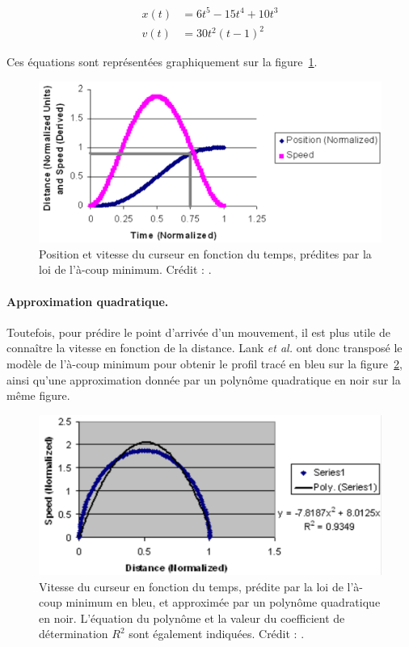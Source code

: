 	\begin{align}
		\label{eq:kepP}
		x(t) &= 6t^{5} - 15t^{4} + 10t^{3} \\
		\label{eq:kepV}
		v(t) &= 30t^{2}(t - 1)^{2}
	\end{align}
	
	Ces équations sont représentées graphiquement sur la figure~\ref{fig:kepPS}.
	
	\begin{figure}[H]
		\centering
		\includegraphics[width=\textwidth]{figures/ch2/kepPS}
		\caption[À-coup minimum -- position et vitesse du curseur vs. temps]{Position et vitesse du curseur en fonction du temps, prédites par la loi de l'à-coup minimum. Crédit : \cite{lank2007endpoint}.}
		\label{fig:kepPS}
	\end{figure}
	
	\paragraph{Approximation quadratique.}
	Toutefois, pour prédire le point d'arrivée d'un mouvement, il est plus utile de connaître la vitesse en fonction de la distance. Lank \emph{et al.} ont donc transposé le modèle de l'à-coup minimum pour obtenir le profil tracé en bleu sur la figure~\ref{fig:kepQuad}, ainsi qu'une approximation donnée par un polynôme quadratique en noir sur la même figure.
	
	\begin{figure}[H]
		\centering
		\includegraphics[width=\textwidth]{figures/ch2/kepQuad}
		\caption[À-coup minimum -- vitesse du curseur vs. temps, approximation quadratique]{Vitesse du curseur en fonction du temps, prédite par la loi de l'à-coup minimum en bleu, et approximée par un polynôme quadratique en noir. L'équation du polynôme et la valeur du coefficient de détermination $R^{2}$ sont également indiquées. Crédit : \cite{lank2007endpoint}.}
		\label{fig:kepQuad}
	\end{figure}
	
